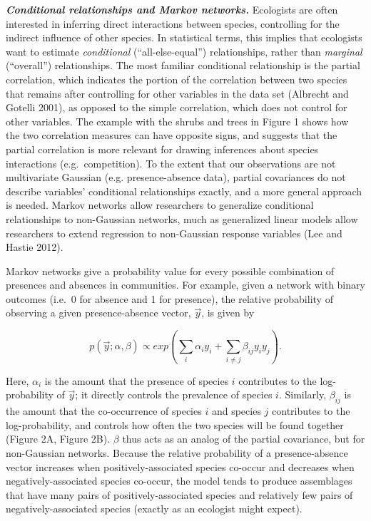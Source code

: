\documentclass[12pt,]{article}
\begin{document}
\begin{spacing}{1.9}
\begin{flushleft}
\textbf{\emph{Conditional relationships and Markov networks.}}
Ecologists are often interested in inferring direct interactions between
species, controlling for the indirect influence of other species. In
statistical terms, this implies that ecologists want to estimate
\emph{conditional} (``all-else-equal'') relationships, rather than
\emph{marginal} (``overall'') relationships. The most familiar
conditional relationship is the partial correlation, which indicates the
portion of the correlation between two species that remains after
controlling for other variables in the data set (Albrecht and Gotelli
2001), as opposed to the simple correlation, which does not control for
other variables. The example with the shrubs and trees in Figure 1 shows
how the two correlation measures can have opposite signs, and suggests
that the partial correlation is more relevant for drawing inferences
about species interactions (e.g.~competition). To the extent that our
observations are not multivariate Gaussian (e.g. presence-absence data),
partial covariances do not describe variables' conditional relationships
exactly, and a more general approach is needed. Markov networks allow
researchers to generalize conditional relationships to non-Gaussian
networks, much as generalized linear models allow researchers to extend
regression to non-Gaussian response variables (Lee and Hastie 2012).

Markov networks give a probability value for every possible combination
of presences and absences in communities. For example, given a network
with binary outcomes (i.e.~0 for absence and 1 for presence), the
relative probability of observing a given presence-absence vector,
\(\vec{y}\), is given by

\[p(\vec{y}; \alpha, \beta) \propto exp(\sum_{i}\alpha_i y_i + \sum_{i\neq j}\beta_{ij}y_i y_j).\]

Here, \(\alpha_{i}\) is the amount that the presence of species \(i\)
contributes to the log-probability of \(\vec{y}\); it directly controls
the prevalence of species \(i\). Similarly, \(\beta_{ij}\) is the amount
that the co-occurrence of species \(i\) and species \(j\) contributes to
the log-probability, and controls how often the two species will be
found together (Figure 2A, Figure 2B). \(\beta\) thus acts as an analog
of the partial covariance, but for non-Gaussian networks. Because the
relative probability of a presence-absence vector increases when
positively-associated species co-occur and decreases when
negatively-associated species co-occur, the model tends to produce
assemblages that have many pairs of positively-associated species and
relatively few pairs of negatively-associated species (exactly as an
ecologist might expect).


\end{flushleft}
\end{spacing}
\end{document}
